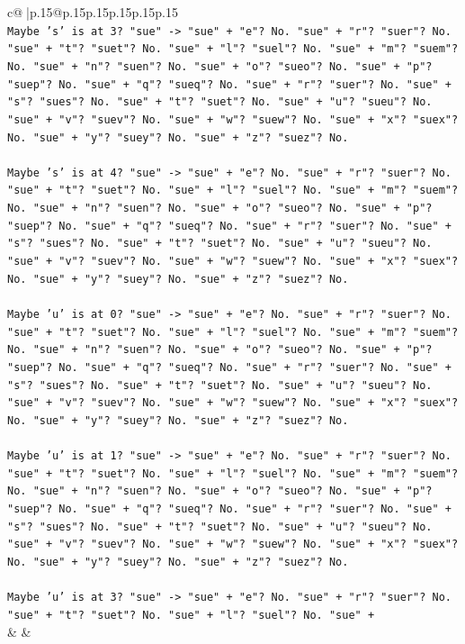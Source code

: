 \documentclass{article}
\begin{document}
{\begin{supertabular}{c@{$\;$}|p{.15\linewidth}@{}p{.15\linewidth}p{.15\linewidth}p{.15\linewidth}p{.15\linewidth}p{.15\linewidth}}
{{{\\ 
\texttt{Maybe 's' is at 3? "sue" {-}> "sue" + "e"? No. "sue" + "r"? "suer"? No. "sue" + "t"? "suet"? No. "sue" + "l"? "suel"? No. "sue" + "m"? "suem"? No. "sue" + "n"? "suen"? No. "sue" + "o"? "sueo"? No. "sue" + "p"? "suep"? No. "sue" + "q"? "sueq"? No. "sue" + "r"? "suer"? No. "sue" + "s"? "sues"? No. "sue" + "t"? "suet"? No. "sue" + "u"? "sueu"? No. "sue" + "v"? "suev"? No. "sue" + "w"? "suew"? No. "sue" + "x"? "suex"? No. "sue" + "y"? "suey"? No. "sue" + "z"? "suez"? No.} \\
\\ 
\texttt{Maybe 's' is at 4? "sue" {-}> "sue" + "e"? No. "sue" + "r"? "suer"? No. "sue" + "t"? "suet"? No. "sue" + "l"? "suel"? No. "sue" + "m"? "suem"? No. "sue" + "n"? "suen"? No. "sue" + "o"? "sueo"? No. "sue" + "p"? "suep"? No. "sue" + "q"? "sueq"? No. "sue" + "r"? "suer"? No. "sue" + "s"? "sues"? No. "sue" + "t"? "suet"? No. "sue" + "u"? "sueu"? No. "sue" + "v"? "suev"? No. "sue" + "w"? "suew"? No. "sue" + "x"? "suex"? No. "sue" + "y"? "suey"? No. "sue" + "z"? "suez"? No.} \\
\\ 
\texttt{Maybe 'u' is at 0? "sue" {-}> "sue" + "e"? No. "sue" + "r"? "suer"? No. "sue" + "t"? "suet"? No. "sue" + "l"? "suel"? No. "sue" + "m"? "suem"? No. "sue" + "n"? "suen"? No. "sue" + "o"? "sueo"? No. "sue" + "p"? "suep"? No. "sue" + "q"? "sueq"? No. "sue" + "r"? "suer"? No. "sue" + "s"? "sues"? No. "sue" + "t"? "suet"? No. "sue" + "u"? "sueu"? No. "sue" + "v"? "suev"? No. "sue" + "w"? "suew"? No. "sue" + "x"? "suex"? No. "sue" + "y"? "suey"? No. "sue" + "z"? "suez"? No.} \\
\\ 
\texttt{Maybe 'u' is at 1? "sue" {-}> "sue" + "e"? No. "sue" + "r"? "suer"? No. "sue" + "t"? "suet"? No. "sue" + "l"? "suel"? No. "sue" + "m"? "suem"? No. "sue" + "n"? "suen"? No. "sue" + "o"? "sueo"? No. "sue" + "p"? "suep"? No. "sue" + "q"? "sueq"? No. "sue" + "r"? "suer"? No. "sue" + "s"? "sues"? No. "sue" + "t"? "suet"? No. "sue" + "u"? "sueu"? No. "sue" + "v"? "suev"? No. "sue" + "w"? "suew"? No. "sue" + "x"? "suex"? No. "sue" + "y"? "suey"? No. "sue" + "z"? "suez"? No.} \\
\\ 
\texttt{Maybe 'u' is at 3? "sue" {-}> "sue" + "e"? No. "sue" + "r"? "suer"? No. "sue" + "t"? "suet"? No. "sue" + "l"? "suel"? No. "sue" +} \\
            }
        }
    }
    & & \\ \\


\end{supertabular}}
\end{document}
